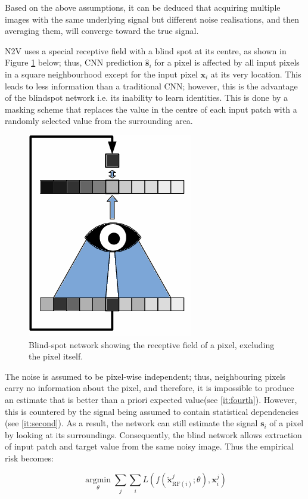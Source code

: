 Based on the above assumptions, it can be deduced that acquiring multiple images with the same underlying signal but different noise realisations, and then averaging them, will converge toward the true signal.

\gls{N2V} uses a special receptive field with a blind spot at its centre, as shown in Figure \ref{fig:blind} below; thus, \gls{CNN} prediction ${{\mathbf{\hat s}}_i}$ for a pixel is affected by all input pixels in a square neighbourhood except for the input pixel ${{\mathbf{x}}_i}$ at its very location. This leads to less information than a traditional \gls{CNN}; however, this is the advantage of the blindspot network i.e. its inability to learn identities. This is done by a masking scheme that replaces the value in the centre of each input patch with a randomly selected value from the surrounding area.

\begin{figure}[h!]
	\centering
	\includegraphics[width=0.3\linewidth]{3_Chapters//3_Chapter_Methodology//Figures/blindspot.png}
	\caption{Blind-spot network showing the receptive field of a pixel, excluding the pixel itself.}
	\label{fig:blind}
\end{figure}

The noise is assumed to be pixel-wise independent; thus, neighbouring pixels carry no information about the pixel, and therefore, it is impossible to produce an estimate that is better than a priori expected value(see \ref{it:fourth}). However, this is countered by the signal being assumed to contain statistical dependencies (see \ref{it:second}). As a result, the network can still estimate the signal ${{\mathbf{s}}_i}$ of a pixel by looking at its surroundings.  Consequently, the blind network allows extraction of input patch and target value from the same noisy image. Thus the empirical risk becomes:

\begin{equation}
	\mathop {\arg \min }\limits_\theta \sum\limits_j {\sum\limits_i {L\left( {f({\mathbf{\tilde x}}_{{\text{RF}}(i)}^j;\theta ),{\mathbf{x}}_i^j} \right)} } 
	\label{eq:minn2v}
\end{equation}

